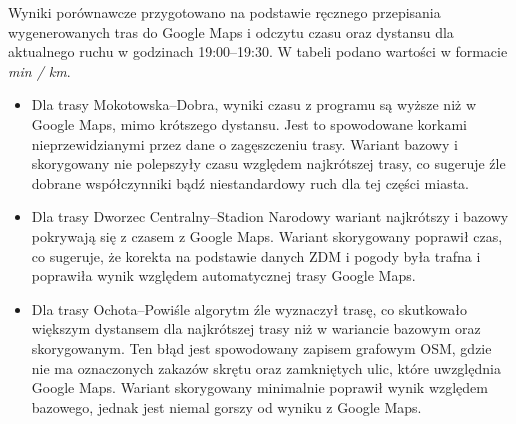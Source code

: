 \documentclass[12pt]{article}
\begin{document}
Wyniki porównawcze przygotowano na podstawie ręcznego przepisania wygenerowanych tras do
Google Maps i odczytu czasu oraz dystansu dla aktualnego ruchu w godzinach 19:00--19:30.
W tabeli podano wartości w formacie \textit{min / km}.

\begin{table}[H]
    \centering
    \small
    \caption{Porównanie czasu i dystansu z Google Maps (19:00--19:30)}
    \label{tab:route-compare-google}
\end{table}

\begin{itemize}
    \item Dla trasy Mokotowska--Dobra, wyniki czasu z programu są wyższe niż w Google Maps,
    mimo krótszego dystansu. Jest to spowodowane korkami nieprzewidzianymi przez dane o zagęszczeniu trasy.
    Wariant bazowy i skorygowany nie polepszyły czasu względem najkrótszej trasy, co sugeruje źle dobrane współczynniki bądź niestandardowy ruch dla tej części miasta.
    \item Dla trasy Dworzec Centralny--Stadion Narodowy wariant najkrótszy i bazowy pokrywają się z czasem z Google Maps. Wariant skorygowany poprawił czas, co sugeruje, że korekta na podstawie danych ZDM i pogody była trafna
    i poprawiła wynik względem automatycznej trasy Google Maps.
    \item Dla trasy Ochota--Powiśle algorytm źle wyznaczył trasę, co skutkowało większym dystansem dla najkrótszej trasy niż w wariancie bazowym oraz skorygowanym.
    Ten błąd jest spowodowany zapisem grafowym OSM, gdzie nie ma oznaczonych zakazów skrętu oraz zamkniętych ulic, które uwzględnia Google Maps.
    Wariant skorygowany minimalnie poprawił wynik względem bazowego, jednak jest niemal gorszy od wyniku z Google Maps. 
\end{itemize}
\end{document}
